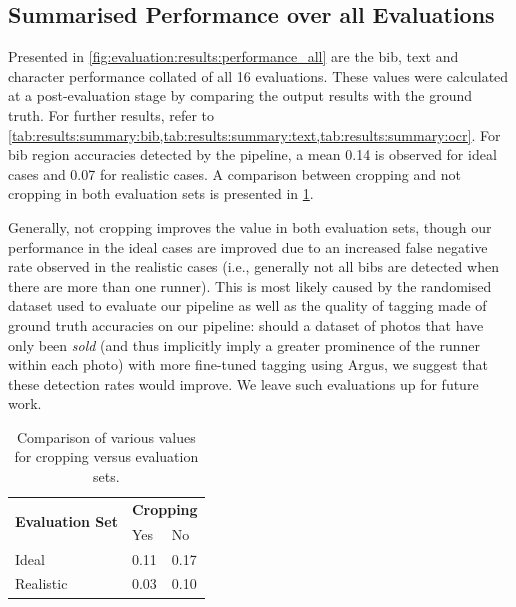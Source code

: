 \subsection{Summarised Performance over all Evaluations}
\label{sec:evaluation:results}

Presented in \cref{fig:evaluation:results:performance_all} are the bib, text and character performance collated of all 16 evaluations. These values were calculated at a post-evaluation stage by comparing the output results with the ground truth. For further results, refer to \cref{tab:results:summary:bib,tab:results:summary:text,tab:results:summary:ocr}. For bib region accuracies detected by the pipeline, a mean \fscore{} 0.14 is observed for ideal cases and 0.07 for realistic cases. A comparison between cropping and not cropping in both evaluation sets is presented in \cref{tab:evaluation:fscore_comparison}.

Generally, not cropping improves the \fscore{} value in both evaluation sets, though our performance in the ideal cases are improved due to an increased false negative rate observed in the realistic cases (i.e., generally not all bibs are detected when there are more than one runner). This is most likely caused by the randomised dataset used to evaluate our pipeline as well as the quality of tagging made of ground truth accuracies on our pipeline: should a dataset of photos that have only been \textit{sold} (and thus implicitly imply a greater prominence of the runner within each photo) with more fine-tuned tagging using Argus, we suggest that these detection rates would improve. We leave such evaluations up for future work.

\begin{table}[h]
\centering
\caption{Comparison of various \fscore{} values for cropping versus evaluation sets.}
\label{tab:evaluation:fscore_comparison}
\begin{tabular}{lll}
\hline
\multicolumn{1}{c}{\multirow{2}{*}{\textbf{Evaluation Set}}} & \multicolumn{2}{c}{\textbf{Cropping}} \\ \cline{2-3} 
\multicolumn{1}{c}{}                                         & Yes                & No               \\ \hline
Ideal                                                        & 0.11               & 0.17             \\ 
Realistic                                                    & 0.03               & 0.10             \\ \hline
\end{tabular}
\end{table}

